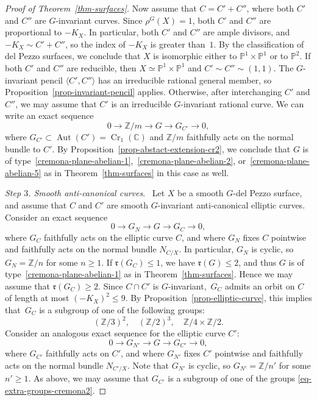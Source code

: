 \documentclass[11pt]{amsart}
\numberwithin{equation}{section}
\theoremstyle{definition}
\theoremstyle{remark}
\newcommand{\lra}{\longrightarrow}
\DeclareMathOperator{\Cr}{Cr}
\DeclareMathOperator{\Aut}{Aut}
\begin{document}
\begin{proof}[Proof of Theorem~\ref{thm-surfaces}]
Now assume that $C=C'+C''$, where both $C'$ and $C''$ are $G$-invariant curves. Since $\rho^G(X)=1$, both $C'$ and $C''$ are proportional to $-K_X$. In particular, both $C'$ and $C''$ are ample divisors, and $-K_X\sim C'+C''$, so the index of $-K_X$ is greater than~$1$. By the classification of del Pezzo surfaces, we conclude that $X$ is isomorphic either to $\mathbb{P}^1\times \mathbb{P}^1$ or to $\mathbb{P}^2$. If both $C'$ and $C''$ are reducible, then $X\simeq\mathbb P^1\times\mathbb P^1$ and $C'\sim C''\sim(1,1)$. The $G$-invariant pencil $\langle C',C''\rangle$ has an irreducible rational general member, so Proposition~\ref{prop-invariant-pencil} applies. Otherwise, after interchanging $C'$ and $C''$, we may assume that $C'$ is an irreducible $G$-invariant rational curve. We can write an exact sequence
\[
0\lra \mathbb{Z}/m \lra G\lra G_{C'}\lra 0,
\]
where $G_{C'}\subset \Aut(C')=\Cr_1(\mathbb{C})$ and $\mathbb{Z}/m$ faithfully acts on the normal bundle to $C'$. 
By Proposition~\ref{prop-abstact-extension-cr2}, we conclude that $G$ is of type~\eqref{cremona-plane-abelian-1},~\eqref{cremona-plane-abelian-2}, or~\eqref{cremona-plane-abelian-5} as in Theorem~\ref{thm-surfaces} in this case as well.

\emph{Step $3$. Smooth anti-canonical curves}.~
Let $X$ be a smooth $G$-del Pezzo surface, and assume that $C$ and $C'$ are smooth $G$-invariant anti-canonical elliptic curves. 
Consider an exact sequence
\[
0\lra G_N \lra G\lra G_C \lra 0, 
\]
where $G_C$ faithfully acts on the elliptic curve $C$, and where $G_N$ fixes $C$ pointwise and faithfully acts on the normal bundle $N_{C/X}$. In particular, $G_N$ is cyclic, so $G_N=\mathbb{Z}/n$ for some $n\geq 1$. If $\mathfrak{r}(G_C)\leq 1$, we have $\mathfrak{r}(G)\leq 2$, and thus $G$ is of type~\eqref{cremona-plane-abelian-1} as in Theorem~\ref{thm-surfaces}. Hence we may assume that $\mathfrak{r}(G_C)\geq 2$. 
Since $C\cap C'$ is $G$-invariant,~$G_C$ admits an orbit on $C$ of length at most $(-K_X)^2\leq 9$. By Proposition~\ref{prop-elliptic-curve}, this implies that~$G_C$ is a subgroup of one of the following groups: 
\begin{equation}
\label{eq-extra-groups-cremona2}
(\mathbb{Z}/3)^2,  \quad (\mathbb{Z}/2)^3,  \quad \mathbb{Z}/4\times \mathbb{Z}/2.
\end{equation}
Consider an analogous exact sequence for the elliptic curve $C'$:
\[
0\lra G_{N'} \lra G\lra G_{C'} \lra 0,
\]
where $G_{C'}$ faithfully acts on $C'$, and where $G_{N'}$ fixes $C'$ pointwise and faithfully acts on the normal bundle $N_{C'/X}$. 
Note that $G_{N'}$ is cyclic, so $G_{N'}=\mathbb{Z}/n'$ for some $n'\geq 1$. As above, we may assume that $G_{C'}$ is a subgroup of one of the groups \eqref{eq-extra-groups-cremona2}. 


\end{proof}
\end{document}
